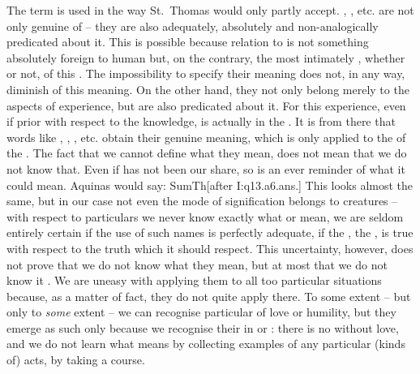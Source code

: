 The term  is used in the way St.~Thomas would only partly
accept.
, , etc. are not only genuine  of 
-- they are also adequately, absolutely and non-analogically predicated about
it.  This is possible because  relation to  is not
something absolutely foreign to human  but, on the contrary, the
most intimately , whether  or not,  of
this . The impossibility to specify  their meaning
does not, in any way, diminish  of this meaning. On the other
hand, they not only belong merely  to the aspects of
 experience, but are also predicated  about it.
For this experience, even if prior with respect to the 
knowledge, is actually  in the . It is from there
that words like , , , etc.  obtain their
genuine meaning, which is only  applied to the 
 of the . The fact that we cannot define
 what they mean, does not mean that we do not know that. Even if
 has not been our share, so  is an ever
 reminder of what it could mean. Aquinas
would say: \citet{as regards what these names signify, they are applied
  primarily to God but as regards the imposition of the names, they are
  primarily applied to creatures which we know first -- hence they have a mode
  of signification which belongs to creatures.}{SumTh}{[after I:q13.a6.ans.]} This
looks almost the same, but in our case not even the mode of signification
belongs to creatures -- with respect to particulars we never know exactly what
 or  mean, we are seldom entirely certain if the use of
such names is perfectly adequate, if the , the , is true
with respect to the  truth which it should respect.  This
uncertainty, however, does not prove that we do not know what they mean, but at
most that we do not know it . We are uneasy with applying them to
all too particular situations because, as a matter of fact, they do not quite
apply there. To some extent -- but only to {\em some} extent -- we can recognise
particular  of love or humility, but they emerge as such only because
we recognise their  in  or : there is no
 without love, and we do not learn what  means by
collecting examples of any particular (kinds of) acts, by taking a course.

